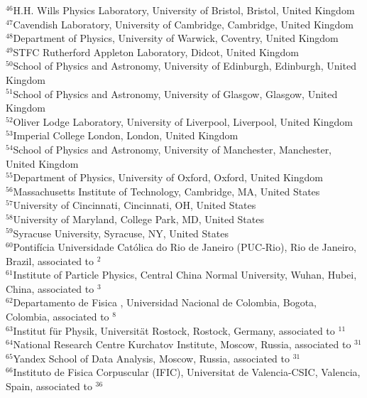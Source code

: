 \documentclass[12pt,a4paper]{article}
\begin{document}
\begin{flushleft}
{$ ^{46}$H.H. Wills Physics Laboratory, University of Bristol, Bristol, United Kingdom\\
$ ^{47}$Cavendish Laboratory, University of Cambridge, Cambridge, United Kingdom\\
$ ^{48}$Department of Physics, University of Warwick, Coventry, United Kingdom\\
$ ^{49}$STFC Rutherford Appleton Laboratory, Didcot, United Kingdom\\
$ ^{50}$School of Physics and Astronomy, University of Edinburgh, Edinburgh, United Kingdom\\
$ ^{51}$School of Physics and Astronomy, University of Glasgow, Glasgow, United Kingdom\\
$ ^{52}$Oliver Lodge Laboratory, University of Liverpool, Liverpool, United Kingdom\\
$ ^{53}$Imperial College London, London, United Kingdom\\
$ ^{54}$School of Physics and Astronomy, University of Manchester, Manchester, United Kingdom\\
$ ^{55}$Department of Physics, University of Oxford, Oxford, United Kingdom\\
$ ^{56}$Massachusetts Institute of Technology, Cambridge, MA, United States\\
$ ^{57}$University of Cincinnati, Cincinnati, OH, United States\\
$ ^{58}$University of Maryland, College Park, MD, United States\\
$ ^{59}$Syracuse University, Syracuse, NY, United States\\
$ ^{60}$Pontif\'{i}cia Universidade Cat\'{o}lica do Rio de Janeiro (PUC-Rio), Rio de Janeiro, Brazil, associated to $^{2}$\\
$ ^{61}$Institute of Particle Physics, Central China Normal University, Wuhan, Hubei, China, associated to $^{3}$\\
$ ^{62}$Departamento de Fisica , Universidad Nacional de Colombia, Bogota, Colombia, associated to $^{8}$\\
$ ^{63}$Institut f\"{u}r Physik, Universit\"{a}t Rostock, Rostock, Germany, associated to $^{11}$\\
$ ^{64}$National Research Centre Kurchatov Institute, Moscow, Russia, associated to $^{31}$\\
$ ^{65}$Yandex School of Data Analysis, Moscow, Russia, associated to $^{31}$\\
$ ^{66}$Instituto de Fisica Corpuscular (IFIC), Universitat de Valencia-CSIC, Valencia, Spain, associated to $^{36}$\\
}
\end{flushleft}
\end{document}
